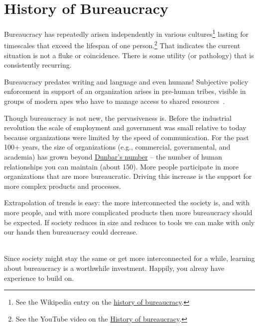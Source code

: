 \section{History of Bureaucracy\label{sec:history}}


Bureaucracy has repeatedly arisen independently in various cultures\footnote{See the Wikipedia entry on the \href{https://en.wikipedia.org/wiki/Bureaucracy\%23History}{history of bureaucracy}.%
}
lasting for timescales that exceed the lifespan of one person.\footnote{See the YouTube video on the \href{https://www.youtube.com/watch?v=B_nsZlcC12g}{History of bureaucracy}.} That indicates the current situation is not a fluke or coincidence. There is some utility (or pathology) that is consistently recurring. 


Bureaucracy predates writing and language and even humans! Subjective policy enforcement in support of an organization arises in pre-human tribes, visible in groups of modern apes who have to manage access to shared resources~\cite{2016_Suchak}. 



Though bureaucracy is not new, the pervasiveness is. Before the industrial revolution the scale of employment and government was small relative to today because organizations were limited by the speed of communication. For the past 100+ years, the size of organizations (e.g., commercial, governmental, and academia) has grown beyond \href{https://en.wikipedia.org/wiki/Dunbar\%27s_number}{Dunbar's number} -- the number of human relationships you can maintain (about 150). \iftoggle{WPinmargin}{\marginpar{$>$Wikipedia: Dunbar's number}}{}
More people participate in more organizations that are more bureaucratic. Driving this increase is the support for more complex products and processes. 


Extrapolation of trends is easy: the more interconnected the society is, and with more people, and with more complicated products then more bureaucracy should be expected. If society reduces in size and reduces to tools we can make with only our hands then bureaucracy could decrease. 


\ \\

Since society might stay the same or get more interconnected for a while, learning about bureaucracy is a worthwhile investment. Happily, you alreay have experience to build on. 
